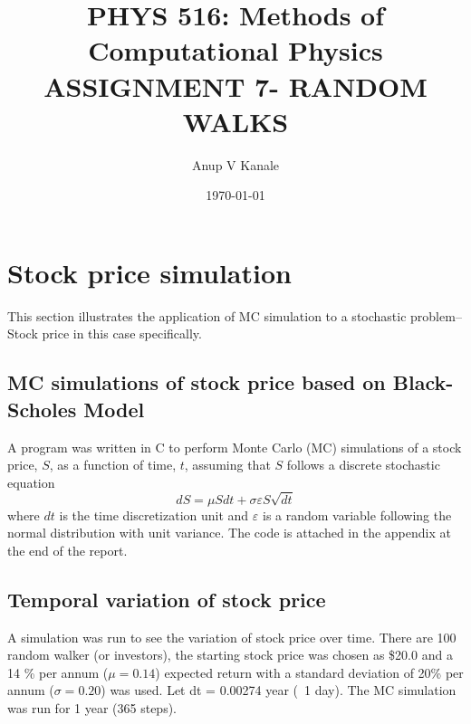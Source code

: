 \documentclass[11pt, oneside]{article}   	%
\title{\vspace{-6ex}\large PHYS 516: Methods of Computational Physics \\ [1ex]
 ASSIGNMENT 7- RANDOM WALKS\vspace{-3ex}}
\author{Anup V Kanale}
\date{\vspace{-3ex}\today}							%
\begin{document}
\vspace{-6ex}\maketitle

\section{\vspace{-1ex}Stock price simulation}
This section illustrates the application of MC simulation to a stochastic problem-- Stock price in this case specifically. \vspace{-2ex}

\subsection{\vspace{-2ex} MC simulations of stock price based on Black-Scholes Model}	
A program was written in C to perform Monte Carlo (MC) simulations of a stock price, $S$, as a function of time, $t$, assuming that $S$ follows a discrete stochastic equation
	\begin{equation}
		dS = \mu S dt + \sigma \varepsilon S \sqrt{dt}
	\end{equation}
where $dt$ is the time discretization unit and $\varepsilon$ is a random variable following the normal distribution with unit variance. The code is attached in the appendix at the end of the report.\vspace{-2ex}

\subsection{\vspace{-2ex} Temporal variation of stock price}
A simulation was run to see the variation of stock price over time. There are 100 random walker (or investors), the starting stock price was chosen as \$20.0 and a 14 \% per annum ($\mu = 0.14$) expected return with a standard deviation of 20\% per annum ($\sigma = 0.20$) was used. Let dt = 0.00274 year (~1 day). The MC simulation was run for 1 year (365 steps).
\end{document}
